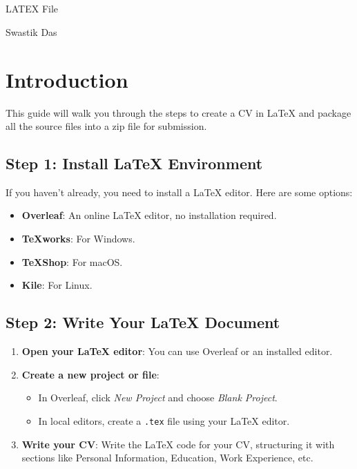 \documentclass{article}
\begin{document}
\begin{normalsize}

 \section{}
    \vspace{.5cm}
    \centerline{LATEX File}
    \vspace{.5cm}
    \centerline{Swastik Das}
    \vspace{.5cm}
 

\section*{Introduction}
This guide will walk you through the steps to create a CV in LaTeX and package all the source files into a zip file for submission.

\subsection{Step 1: Install LaTeX Environment}
If you haven't already, you need to install a LaTeX editor. Here are some options:
\begin{itemize}
    \item \textbf{Overleaf}: An online LaTeX editor, no installation required.
    \item \textbf{TeXworks}: For Windows.
    \item \textbf{TeXShop}: For macOS.
    \item \textbf{Kile}: For Linux.
\end{itemize}

\subsection{Step 2: Write Your LaTeX Document}
\begin{enumerate}
    \item \textbf{Open your LaTeX editor}: You can use Overleaf or an installed editor.
    \item \textbf{Create a new project or file}:
    \begin{itemize}
        \item In Overleaf, click \textit{New Project} and choose \textit{Blank Project}.
        \item In local editors, create a \texttt{.tex} file using your LaTeX editor.
    \end{itemize}
    \item \textbf{Write your CV}: Write the LaTeX code for your CV, structuring it with sections like Personal Information, Education, Work Experience, etc.
\end{enumerate}


\end{normalsize}
\end{document}
